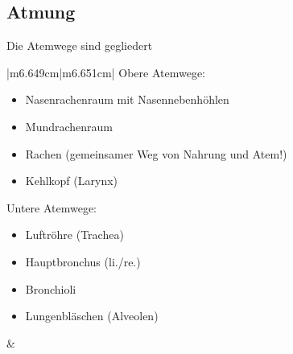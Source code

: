\documentclass{article}
\begin{document}
\subsection{Atmung}
Die Atemwege sind gegliedert

\begin{center}
\tablehead{}\begin{supertabular}{|m{6.649cm}|m{6.651cm}|}
\hline
Obere Atemwege:

\begin{itemize}
\item Nasenrachenraum mit Nasennebenh\"ohlen 

\item Mundrachenraum

\item Rachen (gemeinsamer Weg von Nahrung und Atem!)

\item {}Kehlkopf (Larynx)

\end{itemize}
Untere Atemwege:

\begin{itemize}
\item {}Luftr\"ohre (Trachea)

\item {}Hauptbronchus (li./re.)

\item {}Bronchioli

\item {}Lungenbl\"aschen
(Alveolen)

\end{itemize}
 &
 \par

\\\hline
\end{supertabular}
\end{center}
\end{document}
